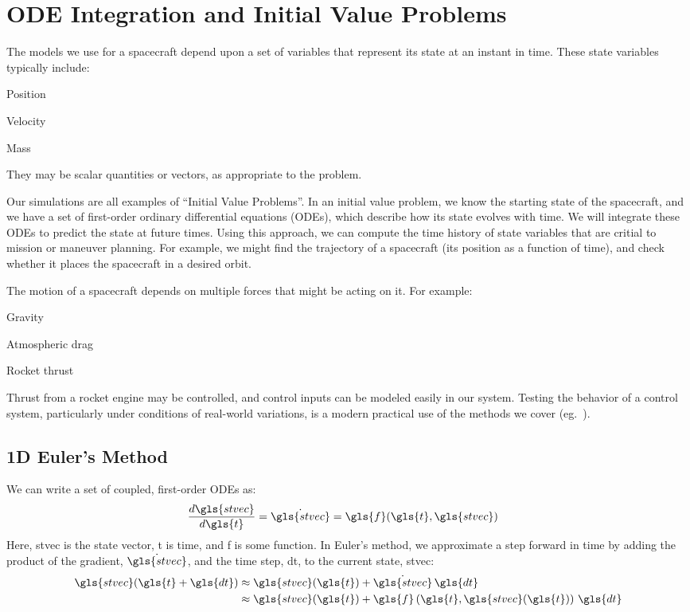 \documentclass[12pt,openany]{book}
\begin{document}
\chapter{ODE Integration and Initial Value Problems}

The models we use for a spacecraft depend upon a set of variables that represent its state at an instant in time. These state variables typically include:
\begin{paritemize}
\item Position
\item Velocity
\item Mass
\end{paritemize}
They may be scalar quantities or vectors, as appropriate to the problem.

Our simulations are all examples of ``Initial Value Problems''. In an initial value problem, we know the starting state of the spacecraft, and we have a set of first-order ordinary differential equations (ODEs), which describe how its state evolves with time. We will integrate these ODEs to predict the state at future times. Using this approach, we can compute the time history of state variables that are critial to mission or maneuver planning. For example, we might find the trajectory of a spacecraft (its position as a function of time), and check whether it places the spacecraft in a desired orbit.

The motion of a spacecraft depends on multiple forces that might be acting on it. For example:
\begin{paritemize}
\item Gravity
\item Atmospheric drag
\item Rocket thrust
\end{paritemize}
Thrust from a rocket engine may be controlled, and control inputs can be modeled easily in our system. Testing the behavior of a control system, particularly under conditions of real-world variations, is a modern practical use of the methods we cover (eg.~\cite{prince2011, brauer1977}).

\section{1D Euler's Method}

We can write a set of coupled, first-order ODEs as:
\begin{align}
  \frac{d\gls{stvec}}{d\gls{t}} &= \dot{\gls{stvec}} = \gls{f}(\gls{t}, \gls{stvec})
\end{align}
Here, \gls{stvec} is the state vector, \gls{t} is time, and \gls{f} is some function. In Euler's method, we approximate a step forward in time by adding the product of the gradient, \(\dot{\gls{stvec}}\), and the time step, \gls{dt}, to the current state, \gls{stvec}:
\begin{align}
  \gls{stvec}(\gls{t} + \gls{dt})
  &\approx \gls{stvec}(\gls{t}) + \dot{\gls{stvec}}\,\gls{dt} \\
  &\approx \gls{stvec}(\gls{t}) + \gls{f}\left(\gls{t}, \gls{stvec}(\gls{t})\right)\,\gls{dt}
\end{align}
\end{document}
